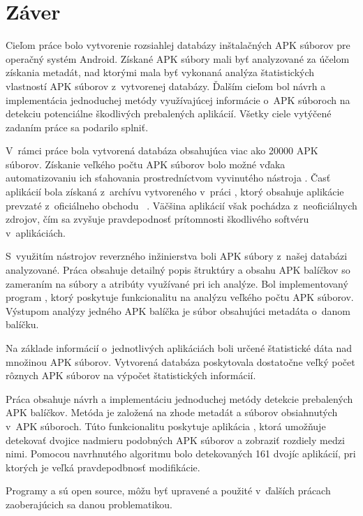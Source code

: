 \chapter{Záver}
Cieľom práce bolo vytvorenie rozsiahlej databázy inštalačných APK súborov pre operačný systém Android. Získané APK súbory mali byť analyzované za účelom získania metadát, nad ktorými mala byť vykonaná analýza štatistických vlastností APK súborov z~vytvorenej databázy. Ďalším cieľom bol návrh a implementácia jednoduchej metódy využívajúcej informácie o~APK súboroch na detekciu potenciálne škodlivých prebalených aplikácií. Všetky ciele vytýčené zadaním práce sa podarilo splniť.

V~rámci práce bola vytvorená databáza obsahujúca viac ako 20000 APK súborov. Získanie veľkého počtu APK súborov bolo možné vďaka automatizovaniu ich sťahovania prostredníctvom vyvinutého nástroja . Časť aplikácií bola získaná z~archívu vytvoreného v~práci , ktorý obsahuje aplikácie prevzaté z~oficiálneho obchodu ~\cite{Viennot2014}. Väčšina aplikácií však pochádza z~neoficiálnych zdrojov, čím sa zvyšuje pravdepodnosť prítomnosti škodlivého softvéru v~aplikáciách. 

S~využitím nástrojov reverzného inžinierstva boli APK súbory z~našej databázi analyzované. Práca obsahuje detailný popis štruktúry a obsahu APK balíčkov so zameraním na súbory a atribúty využívané pri ich analýze. Bol implementovaný program , ktorý poskytuje funkcionalitu na analýzu veľkého počtu APK súborov. Výstupom analýzy jedného APK balíčka je súbor obsahujúci metadáta o~danom balíčku.

Na základe informácií o~jednotlivých aplikáciách boli určené štatistické dáta nad množinou APK súborov. Vytvorená databáza poskytovala dostatočne veľký počet rôznych APK súborov na výpočet štatistických informácií.

Práca obsahuje návrh a implementáciu jednoduchej metódy detekcie prebalených APK balíčkov. Metóda je založená na zhode metadát a súborov obsiahnutých v~APK súboroch. Túto funkcionalitu poskytuje aplikácia , ktorá umožňuje detekovať dvojice nadmieru podobných APK súborov a zobraziť rozdiely medzi nimi. Pomocou navrhnutého algoritmu bolo detekovaných 161 dvojíc aplikácií, pri ktorých je veľká pravdepodbnosť modifikácie.

Programy  a  sú open source, môžu byť upravené a použité v~ďalších prácach zaoberajúcich sa danou problematikou. 